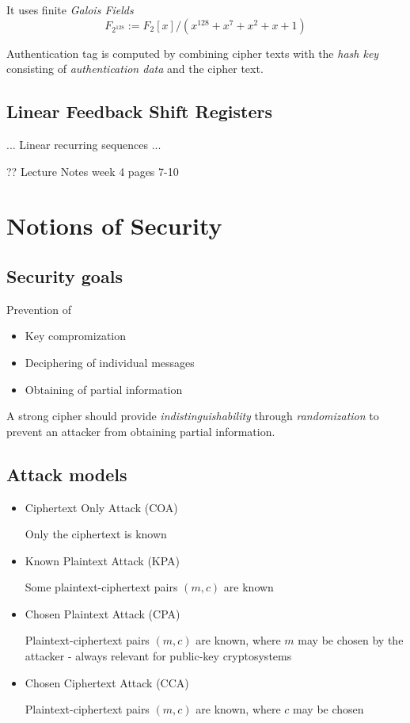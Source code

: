 \documentclass[a4paper]{scrartcl}
\begin{document}
It uses finite \textit{Galois Fields} \[F_{2^{128}}:=F_2[x]/(x^{128}+x^7+x^2+x+1)\]

Authentication tag is computed by combining cipher texts with the \textit{hash key}
consisting of \textit{authentication data} and the cipher text.

\subsection{Linear Feedback Shift Registers}

... Linear recurring sequences ...

?? Lecture Notes week 4 pages 7-10

\section{Notions of Security}

\subsection{Security goals}
Prevention of
\begin{itemize}
    \item Key compromization
    \item Deciphering of individual messages
    \item Obtaining of partial information
\end{itemize}

A strong cipher should provide \textit{indistinguishability} through \textit{randomization}
to prevent an attacker from obtaining partial information.

\subsection{Attack models}

\begin{itemize}
    \item Ciphertext Only Attack (COA)

        Only the ciphertext is known
    \item Known Plaintext Attack (KPA)

        Some plaintext-ciphertext pairs $(m,c)$ are known
    \item Chosen Plaintext Attack (CPA)

        Plaintext-ciphertext pairs $(m,c)$ are known, where $m$ may be chosen by the attacker
        - always relevant for public-key cryptosystems
    \item Chosen Ciphertext Attack (CCA)

        Plaintext-ciphertext pairs $(m,c)$ are known, where $c$ may be chosen
\end{itemize}
\end{document}
